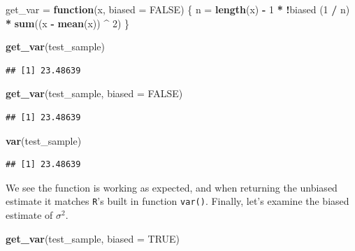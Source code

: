 \documentclass[]{book}
\newenvironment{Shaded}{\begin{snugshade}}{\end{snugshade}}
\newcommand{\KeywordTok}[1]{\textcolor[rgb]{0.13,0.29,0.53}{\textbf{#1}}}
\newcommand{\DataTypeTok}[1]{\textcolor[rgb]{0.13,0.29,0.53}{#1}}
\newcommand{\DecValTok}[1]{\textcolor[rgb]{0.00,0.00,0.81}{#1}}
\newcommand{\StringTok}[1]{\textcolor[rgb]{0.31,0.60,0.02}{#1}}
\newcommand{\OtherTok}[1]{\textcolor[rgb]{0.56,0.35,0.01}{#1}}
\newcommand{\ControlFlowTok}[1]{\textcolor[rgb]{0.13,0.29,0.53}{\textbf{#1}}}
\newcommand{\OperatorTok}[1]{\textcolor[rgb]{0.81,0.36,0.00}{\textbf{#1}}}
\newcommand{\NormalTok}[1]{#1}
\theoremstyle{definition}
\theoremstyle{definition}
\theoremstyle{definition}
\theoremstyle{remark}
\begin{document}
\begin{Shaded}
\begin{Highlighting}[]
\NormalTok{get_var =}\StringTok{ }\ControlFlowTok{function}\NormalTok{(x, }\DataTypeTok{biased =} \OtherTok{FALSE}\NormalTok{) \{}
\NormalTok{  n =}\StringTok{ }\KeywordTok{length}\NormalTok{(x) }\OperatorTok{-}\StringTok{ }\DecValTok{1} \OperatorTok{*}\StringTok{ }\OperatorTok{!}\NormalTok{biased}
\NormalTok{  (}\DecValTok{1} \OperatorTok{/}\StringTok{ }\NormalTok{n) }\OperatorTok{*}\StringTok{ }\KeywordTok{sum}\NormalTok{((x }\OperatorTok{-}\StringTok{ }\KeywordTok{mean}\NormalTok{(x)) }\OperatorTok{^}\StringTok{ }\DecValTok{2}\NormalTok{)}
\NormalTok{\}}
\end{Highlighting}
\end{Shaded}

\begin{Shaded}
\begin{Highlighting}[]
\KeywordTok{get_var}\NormalTok{(test_sample)}
\end{Highlighting}
\end{Shaded}

\begin{verbatim}
## [1] 23.48639
\end{verbatim}

\begin{Shaded}
\begin{Highlighting}[]
\KeywordTok{get_var}\NormalTok{(test_sample, }\DataTypeTok{biased =} \OtherTok{FALSE}\NormalTok{)}
\end{Highlighting}
\end{Shaded}

\begin{verbatim}
## [1] 23.48639
\end{verbatim}

\begin{Shaded}
\begin{Highlighting}[]
\KeywordTok{var}\NormalTok{(test_sample)}
\end{Highlighting}
\end{Shaded}

\begin{verbatim}
## [1] 23.48639
\end{verbatim}

We see the function is working as expected, and when returning the
unbiased estimate it matches \texttt{R}'s built in function
\texttt{var()}. Finally, let's examine the biased estimate of
\(\sigma^2\).

\begin{Shaded}
\begin{Highlighting}[]
\KeywordTok{get_var}\NormalTok{(test_sample, }\DataTypeTok{biased =} \OtherTok{TRUE}\NormalTok{)}
\end{Highlighting}
\end{Shaded}
\end{document}
